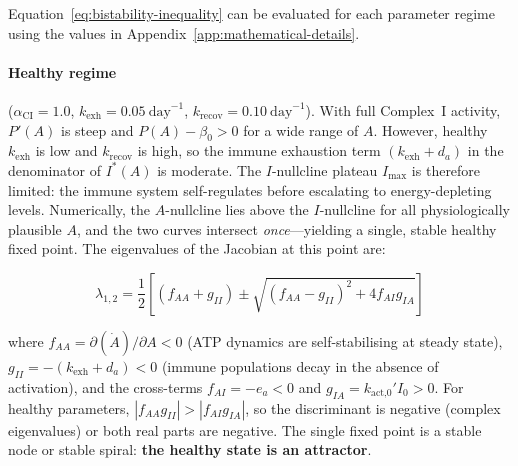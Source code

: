 Equation~\ref{eq:bistability-inequality} can be evaluated for each parameter regime using the values in Appendix~\ref{app:mathematical-details}.

\paragraph{Healthy regime} ($\alpha_{\text{CI}} = 1.0$, $k_{\text{exh}} = 0.05\ \text{day}^{-1}$, $k_{\text{recov}} = 0.10\ \text{day}^{-1}$).
With full Complex~I activity, $P'(A)$ is steep and $P(A) - \beta_0 > 0$ for a wide range of $A$. However, healthy $k_{\text{exh}}$ is low and $k_{\text{recov}}$ is high, so the immune exhaustion term $(k_{\text{exh}} + d_a)$ in the denominator of $I^*(A)$ is moderate. The $I$-nullcline plateau $I_{\max}$ is therefore limited: the immune system self-regulates before escalating to energy-depleting levels. Numerically, the $A$-nullcline lies above the $I$-nullcline for all physiologically plausible $A$, and the two curves intersect \emph{once}---yielding a single, stable healthy fixed point. The eigenvalues of the Jacobian at this point are:

\begin{equation}
\label{eq:healthy-eigenvalues}
\lambda_{1,2} = \frac{1}{2}\left[(f_{AA} + g_{II}) \pm \sqrt{(f_{AA} - g_{II})^2 + 4 f_{AI} g_{IA}}\right]
\end{equation}

where $f_{AA} = \partial(\dot{A})/\partial A < 0$ (ATP dynamics are self-stabilising at steady state), $g_{II} = -(k_{\text{exh}} + d_a) < 0$ (immune populations decay in the absence of activation), and the cross-terms $f_{AI} = -e_a < 0$ and $g_{IA} = k_{\text{act,0}}' I_0 > 0$. For healthy parameters, $|f_{AA} g_{II}| > |f_{AI} g_{IA}|$, so the discriminant is negative (complex eigenvalues) or both real parts are negative. The single fixed point is a stable node or stable spiral: \textbf{the healthy state is an attractor}.

